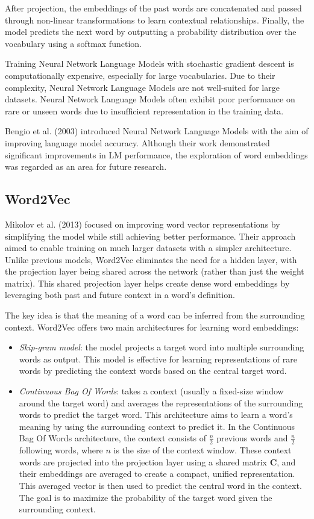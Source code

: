 After projection, the embeddings of the past words are concatenated and passed through non-linear transformations to learn contextual relationships. 
Finally, the model predicts the next word by outputting a probability distribution over the vocabulary using a softmax function.

Training Neural Network Language Models with stochastic gradient descent is computationally expensive, especially for large vocabularies.
Due to their complexity, Neural Network Language Models are not well-suited for large datasets.
Neural Network Language Models often exhibit poor performance on rare or unseen words due to insufficient representation in the training data.

Bengio et al. (2003) introduced Neural Network Language Models with the aim of improving language model accuracy. 
Although their work demonstrated significant improvements in LM performance, the exploration of word embeddings was regarded as an area for future research.

\subsection{Word2Vec}
Mikolov et al. (2013) focused on improving word vector representations by simplifying the model while still achieving better performance. 
Their approach aimed to enable training on much larger datasets with a simpler architecture. 
Unlike previous models, Word2Vec eliminates the need for a hidden layer, with the projection layer being shared across the network (rather than just the weight matrix). 
This shared projection layer helps create dense word embeddings by leveraging both past and future context in a word's definition.

The key idea is that the meaning of a word can be inferred from the surrounding context.
Word2Vec offers two main architectures for learning word embeddings:
\begin{itemize}
    \item \textit{Skip-gram model}: the model projects a target word into multiple surrounding words as output. 
        This model is effective for learning representations of rare words by predicting the context words based on the central target word.
        \item \textit{Continuous Bag Of Words}: takes a context (usually a fixed-size window around the target word) and averages the representations of the surrounding words to predict the target word. 
        This architecture aims to learn a word's meaning by using the surrounding context to predict it.
        In the Continuous Bag Of Words architecture, the context consists of $\frac{n}{2}$ previous words and $\frac{n}{2}$ following words, where $n$ is the size of the context window.
        These context words are projected into the projection layer using a shared matrix $\mathbf{C}$, and their embeddings are averaged to create a compact, unified representation.
        This averaged vector is then used to predict the central word in the context. 
        The goal is to maximize the probability of the target word given the surrounding context.
\end{itemize}

